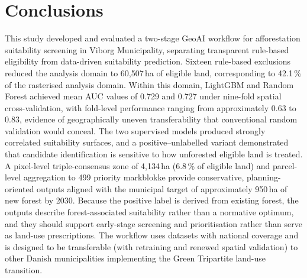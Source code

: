\documentclass[land,article,submit,moreauthors]{Definitions/mdpi}
\begin{document}
\section{Conclusions}

This study developed and evaluated a two-stage GeoAI workflow for afforestation suitability screening in Viborg Municipality, separating transparent rule-based eligibility from data-driven suitability prediction. Sixteen rule-based exclusions reduced the analysis domain to 60{,}507\,ha of eligible land, corresponding to 42.1\,\% of the rasterised analysis domain. Within this domain, LightGBM and Random Forest achieved mean AUC values of 0.729 and 0.727 under nine-fold spatial cross-validation, with fold-level performance ranging from approximately 0.63 to 0.83, evidence of geographically uneven transferability that conventional random validation would conceal. The two supervised models produced strongly correlated suitability surfaces, and a positive--unlabelled variant demonstrated that candidate identification is sensitive to how unforested eligible land is treated. A pixel-level triple-consensus zone of 4{,}134\,ha (6.8\,\% of eligible land) and parcel-level aggregation to 499 priority markblokke provide conservative, planning-oriented outputs aligned with the municipal target of approximately 950\,ha of new forest by 2030. Because the positive label is derived from existing forest, the outputs describe forest-associated suitability rather than a normative optimum, and they should support early-stage screening and prioritisation rather than serve as land-use prescriptions. The workflow uses datasets with national coverage and is designed to be transferable (with retraining and renewed spatial validation) to other Danish municipalities implementing the Green Tripartite land-use transition.



\end{document}
